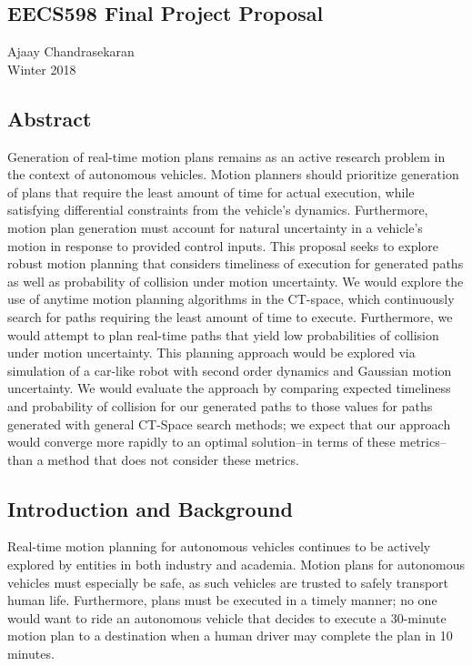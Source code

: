 \documentclass[12pt]{article}
\begin{document}
\begin{center}
\section*{EECS598 Final Project Proposal}
Ajaay Chandrasekaran\\
Winter 2018
\end{center}

\subsection*{Abstract}
Generation of real-time motion plans remains as an active research problem in the context of autonomous vehicles. Motion planners should prioritize generation of plans that require the least amount of time for actual execution, while satisfying differential constraints from the vehicle's dynamics. Furthermore, motion plan generation must account for natural uncertainty in a vehicle's motion in response to provided control inputs. This proposal seeks to explore robust motion planning that considers timeliness of execution for generated paths as well as probability of collision under motion uncertainty. We would explore the use of anytime motion planning algorithms in the CT-space, which continuously search for paths requiring the least amount of time to execute. Furthermore, we would attempt to plan real-time paths that yield low probabilities of collision under motion uncertainty. This planning approach would be explored via simulation of a car-like robot with second order dynamics and Gaussian motion uncertainty. We would evaluate the approach by comparing expected timeliness and probability of collision for our generated paths to those values for paths generated with general CT-Space search methods; we expect that our approach would converge more rapidly to an optimal solution--in terms of these metrics--than a method that does not consider these metrics.

\subsection*{Introduction and Background}
Real-time motion planning for autonomous vehicles continues to be actively explored by entities in both industry and academia. Motion plans for autonomous vehicles must especially be safe, as such vehicles are trusted to safely transport human life. Furthermore, plans must be executed in a timely manner; no one would want to ride an autonomous vehicle that decides to execute a 30-minute motion plan to a destination when a human driver may complete the plan in 10 minutes.
\end{document}

